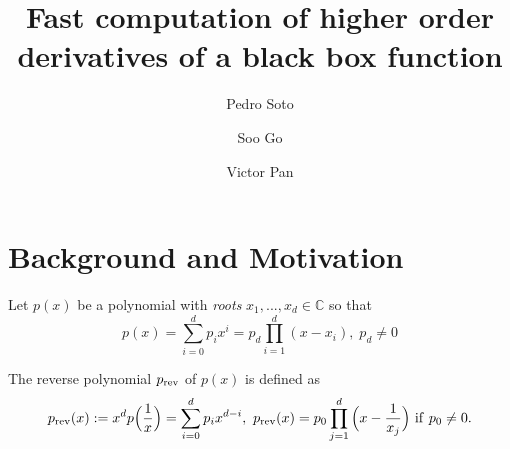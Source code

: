 \documentclass[runningheads]{llncs}
\begin{document}
%
\title{Fast computation of higher  order derivatives of a black box  function}
%
%
\author{Pedro Soto \and
Soo Go \and
Victor Pan}
%
%
%
\maketitle              %
%
\begin{abstract}

\end{abstract}
%
%
%

\section{Background and Motivation}\label{srrapp}
Let $p(x)$ be a polynomial with \emph{roots} $x_1, ..., x_d \in \mathbb{C}$ so that
\begin{equation}\label{eqpoly}
p(x) = \sum_{i=0}^{d} p_i x^i = p_d \prod_{i=1}^d (x-x_i), \; p_d \neq 0
\end{equation}


The reverse polynomial $p_{\rm rev}$ of $p(x)$ is defined as
 \begin{equation}\label{eqpolyrev}
p_{\rm rev}(x):=x^dp\Big(\frac{1}{x}\Big)=\sum_{i=0}^dp_ix^{d-i},~
p_{\rm rev}(x)=p_0\prod_{j=1}^d\Big(x-\frac{1}{x_j}\Big)~{\rm if}~p_0\neq 0.
\end{equation}

\end{document}
